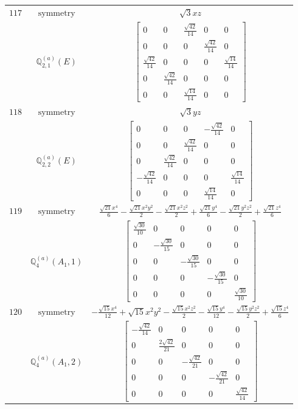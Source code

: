 \documentclass[fleqn,8pt,landscape]{jsarticle}
\begin{document}
\begin{longtable}{ccc}
$ 117 $ & $ \text{symmetry} $ & $ \sqrt{3} x z $ \\
$  $ & $ \mathbb{Q}_{2,1}^{(a)}(E) $ & $ \begin{bmatrix} 0 & 0 & \frac{\sqrt{42}}{14} & 0 & 0 \\ 0 & 0 & 0 & \frac{\sqrt{42}}{14} & 0 \\ \frac{\sqrt{42}}{14} & 0 & 0 & 0 & \frac{\sqrt{14}}{14} \\ 0 & \frac{\sqrt{42}}{14} & 0 & 0 & 0 \\ 0 & 0 & \frac{\sqrt{14}}{14} & 0 & 0 \end{bmatrix} $ \\ \hline
$ 118 $ & $ \text{symmetry} $ & $ \sqrt{3} y z $ \\
$  $ & $ \mathbb{Q}_{2,2}^{(a)}(E) $ & $ \begin{bmatrix} 0 & 0 & 0 & - \frac{\sqrt{42}}{14} & 0 \\ 0 & 0 & \frac{\sqrt{42}}{14} & 0 & 0 \\ 0 & \frac{\sqrt{42}}{14} & 0 & 0 & 0 \\ - \frac{\sqrt{42}}{14} & 0 & 0 & 0 & \frac{\sqrt{14}}{14} \\ 0 & 0 & 0 & \frac{\sqrt{14}}{14} & 0 \end{bmatrix} $ \\ \hline
$ 119 $ & $ \text{symmetry} $ & $ \frac{\sqrt{21} x^{4}}{6} - \frac{\sqrt{21} x^{2} y^{2}}{2} - \frac{\sqrt{21} x^{2} z^{2}}{2} + \frac{\sqrt{21} y^{4}}{6} - \frac{\sqrt{21} y^{2} z^{2}}{2} + \frac{\sqrt{21} z^{4}}{6} $ \\
$  $ & $ \mathbb{Q}_{4}^{(a)}(A_{1},1) $ & $ \begin{bmatrix} \frac{\sqrt{30}}{10} & 0 & 0 & 0 & 0 \\ 0 & - \frac{\sqrt{30}}{15} & 0 & 0 & 0 \\ 0 & 0 & - \frac{\sqrt{30}}{15} & 0 & 0 \\ 0 & 0 & 0 & - \frac{\sqrt{30}}{15} & 0 \\ 0 & 0 & 0 & 0 & \frac{\sqrt{30}}{10} \end{bmatrix} $ \\ \hline
$ 120 $ & $ \text{symmetry} $ & $ - \frac{\sqrt{15} x^{4}}{12} + \sqrt{15} x^{2} y^{2} - \frac{\sqrt{15} x^{2} z^{2}}{2} - \frac{\sqrt{15} y^{4}}{12} - \frac{\sqrt{15} y^{2} z^{2}}{2} + \frac{\sqrt{15} z^{4}}{6} $ \\
$  $ & $ \mathbb{Q}_{4}^{(a)}(A_{1},2) $ & $ \begin{bmatrix} - \frac{\sqrt{42}}{14} & 0 & 0 & 0 & 0 \\ 0 & \frac{2 \sqrt{42}}{21} & 0 & 0 & 0 \\ 0 & 0 & - \frac{\sqrt{42}}{21} & 0 & 0 \\ 0 & 0 & 0 & - \frac{\sqrt{42}}{21} & 0 \\ 0 & 0 & 0 & 0 & \frac{\sqrt{42}}{14} \end{bmatrix} $ \\ \hline

\end{longtable}
\end{document}

